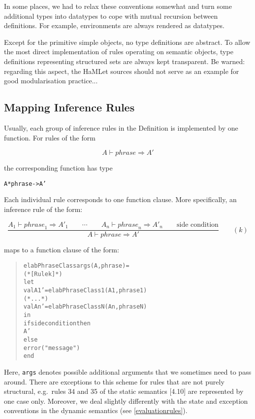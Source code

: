 \documentclass[twoside,titlepage]{article}
\begin{document}
In some places, we had to relax these conventions somewhat and turn some additional types into datatypes to cope with mutual recursion between definitions. For example, environments are always rendered as datatypes.

Except for the primitive simple objects, no type definitions are abstract. To allow the most direct implementation of rules operating on semantic objects, type definitions representing structured sets are always kept transparent. Be warned: regarding this aspect, the HaMLet sources should not serve as an example for good modularisation practice...


\subsection{Mapping Inference Rules}
\label{mappingrules}

Usually, each group of inference rules in the Definition is implemented by one function. For rules of the form

\begin{displaymath}
A \vdash \mathit{phrase} \Rightarrow A'
\end{displaymath}

the corresponding function has type

\begin{alltt}
\hfill A * phrase -> A' \hfill
\end{alltt}

Each individual rule corresponds to one function clause. More specifically, an inference rule of the form:

\begin{displaymath}
\frac{
A_1 \vdash \mathit{phrase}_1 \Rightarrow A'_1
\qquad
\cdots
\qquad
A_n \vdash \mathit{phrase}_n \Rightarrow A'_n
\qquad
\mbox{side condition}
}{
A \vdash \mathit{phrase} \Rightarrow A'
}
\qquad (k)
\end{displaymath}

maps to a function clause of the form:

\begin{quote}
\begin{alltt}
elabPhraseClass args (A, phrase) =
(* [Rule k] *)
let
    val A1' = elabPhraseClass1(A1, phrase1)
    (* ... *)
    val An' = elabPhraseClassN(An, phraseN)
in
    if side condition then
        A'
    else
        error("message")
end
\end{alltt}
\end{quote}

Here, {\tt args} denotes possible additional arguments that we sometimes need to pass around. There are exceptions to this scheme for rules that are not purely structural, e.g.\ rules 34 and 35 of the static semantics [4.10] are represented by one case only. Moreover, we deal slightly differently with the state and exception conventions in the dynamic semantics (see \ref{evaluationrules}).
\end{document}

